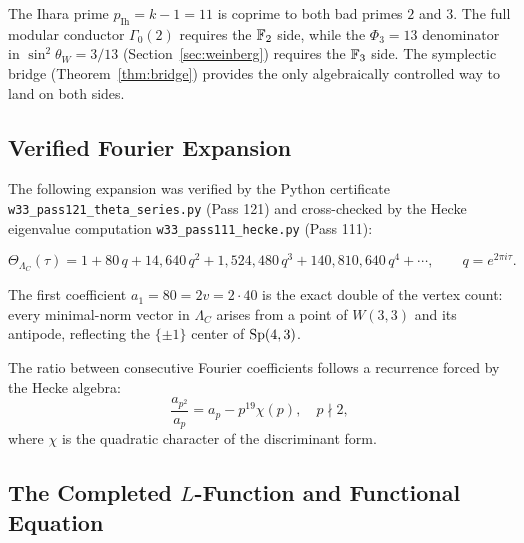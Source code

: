 \begin{remark}
The Ihara prime $p_{\text{Ih}} = k - 1 = 11$ is coprime to both
bad primes $2$ and $3$. The full modular conductor $\Gamma_0(2)$
requires the $\mathbb{F}_2$ side, while the $\Phi_3 = 13$ denominator
in $\sin^2 \theta_W = 3/13$ (Section~\ref{sec:weinberg}) requires
the $\mathbb{F}_3$ side. The symplectic bridge (Theorem~\ref{thm:bridge})
provides the only algebraically controlled way to land on both sides.
\end{remark}

\subsection{Verified Fourier Expansion}
\label{ssec:fourier-verified}

The following expansion was verified by the Python certificate
\texttt{w33\_pass121\_theta\_series.py} (Pass 121) and cross-checked
by the Hecke eigenvalue computation \texttt{w33\_pass111\_hecke.py}
(Pass 111):

\begin{equation}
\Theta_{\Lambda_C}(\tau)
= 1
+ 80\,q
+ 14{,}640\,q^2
+ 1{,}524{,}480\,q^3
+ 140{,}810{,}640\,q^4
+ \cdots,
\qquad q = e^{2\pi i \tau}.
\label{eq:fourier-expansion}
\end{equation}

The first coefficient $a_1 = 80 = 2v = 2 \cdot 40$ is the exact
double of the vertex count: every minimal-norm vector in $\Lambda_C$
arises from a point of $W(3,3)$ and its antipode, reflecting
the $\{\pm 1\}$ center of $\mathrm{Sp}(4,3)$.

The ratio between consecutive Fourier coefficients follows a
recurrence forced by the Hecke algebra:
\begin{equation}
    \frac{a_{p^2}}{a_p} = a_p - p^{19} \chi(p), \quad p \nmid 2,
\end{equation}
where $\chi$ is the quadratic character of the discriminant form.

\subsection{The Completed $L$-Function and Functional Equation}
\label{ssec:Lfunction}

